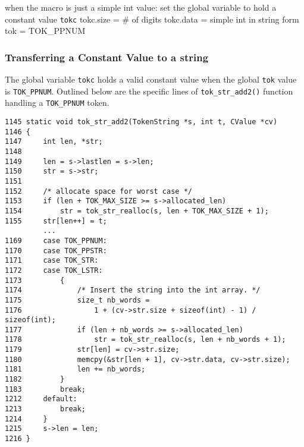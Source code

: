 %
% 





when the macro is just a simple int value:
        set the global variable to hold a constant value \verb|tokc|
        tokc.size = \# of digits
        tokc.data = simple int in string form
        tok = TOK\_PPNUM


\subsubsection{Transferring a Constant Value to a string}

The global variable \verb|tokc| holds a valid constant value when the global \verb|tok| value is \verb|TOK_PPNUM|. Outlined below are the specific lines of \verb|tok_str_add2()| function handling a \verb|TOK_PPNUM| token.

\begin{verbatim}
1145 static void tok_str_add2(TokenString *s, int t, CValue *cv)
1146 {
1147     int len, *str;
1148 
1149     len = s->lastlen = s->len;
1150     str = s->str;
1151 
1152     /* allocate space for worst case */
1153     if (len + TOK_MAX_SIZE >= s->allocated_len)
1154         str = tok_str_realloc(s, len + TOK_MAX_SIZE + 1);
1155     str[len++] = t;
         ...
1169     case TOK_PPNUM:
1170     case TOK_PPSTR:
1171     case TOK_STR:
1172     case TOK_LSTR:
1173         {
1174             /* Insert the string into the int array. */
1175             size_t nb_words =
1176                 1 + (cv->str.size + sizeof(int) - 1) / sizeof(int);
1177             if (len + nb_words >= s->allocated_len)
1178                 str = tok_str_realloc(s, len + nb_words + 1);
1179             str[len] = cv->str.size;
1180             memcpy(&str[len + 1], cv->str.data, cv->str.size);
1181             len += nb_words;
1182         }
1183         break;
1212     default:
1213         break;
1214     }
1215     s->len = len;
1216 }
\end{verbatim}

